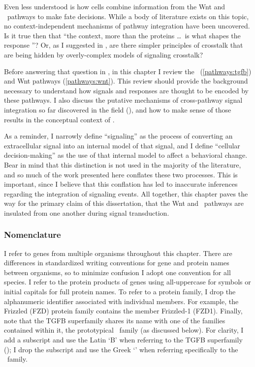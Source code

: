 Even less understood is how
cells combine information from the Wnt and \tgfbsf\ pathways to make fate
decisions. While a body of literature exists on this topic, no
context-independent mechanisms of pathway integration have been
uncovered. Is it true then that
``the context, more than the proteins \ldots\
is what shapes the response \cite{Massague2012}''? Or, as I suggested in
\ar{introduction:introduction}, are there simpler principles of
crosstalk that are being hidden by overly-complex models of signaling
crosstalk?


Before answering that question in ,
in this chapter I review the \tgfbsf\ (\autoref{pathways:tgfb})
and Wnt pathways (\autoref{pathways:wnt}). This review should provide the background
necessary to understand how signals and responses are thought to be encoded
by these pathways. I also discuss the putative mechanisms of cross-pathway
signal integration so far discovered in the field
(), and how to make sense of those
results in the conceptual context of .


As a reminder, I narrowly define ``signaling'' as the process of converting
an extracellular signal into an internal model of that signal, and I define
``cellular decision-making'' as the use of that internal model to affect
a behavioral change. Bear in mind that this distinction is not used in the
majority of the literature, and so much of the work presented here conflates
these two processes. This is important, since I believe that this conflation
has led to inaccurate inferences regarding the integration of signaling events.
All together, this chapter paves the way for the primary
claim of this dissertation, that the Wnt and \tgfbsf\ pathways
are insulated from one another during signal transduction.


\subsubsection{Nomenclature}

I refer to genes from
multiple organisms throughout this chapter. There are differences
in standardized writing conventions for gene and protein names between organisms, so
to minimize confusion I adopt one convention for all species. I refer
to the protein products of genes using all-uppercase for
symbols or initial capitals for full protein names. To refer to a protein
family, I drop the alphanumeric identifier associated with individual members.
For example, the Frizzled (FZD) protein family contains the member Frizzled-1
(FZD1). Finally, note that the TGFB superfamily shares its name with
one of the families contained within it, the
prototypical \tgf\ family (as discussed below).
For clarity, I add a subscript and use the Latin `B'
when referring to the TGFB superfamily (\tgfbsf); I drop the subscript 
and use the Greek `\textbeta' when
referring specifically to the \tgf\ family.












